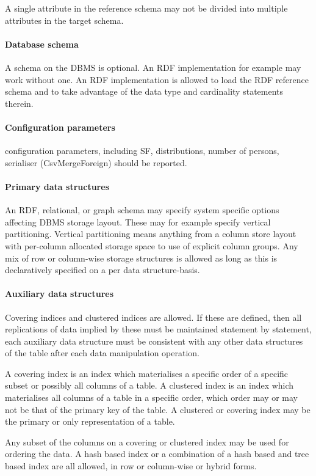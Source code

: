 A single attribute in the reference schema may not be divided into multiple attributes in the target schema.

\paragraph{Database schema}
A schema on the DBMS is optional. An RDF implementation for example may work without one. An RDF implementation is allowed to load the RDF reference schema and to take advantage of the data type and cardinality statements therein. 

\paragraph{Configuration parameters}
\datagen configuration parameters, including SF, distributions, number of persons, serialiser (\eg CsvMergeForeign) should be reported.

\paragraph{Primary data structures}
An RDF, relational, or graph schema may specify system specific options affecting DBMS storage layout. These may for example specify vertical partitioning. Vertical partitioning means anything from a column store layout with per-column allocated storage space to use of explicit column groups. Any mix of row or column-wise storage structures is allowed as long as this is declaratively specified on a per data structure-basis.

\paragraph{Auxiliary data structures}
Covering indices and clustered indices are allowed. If these are defined, then all replications of data implied by these must be maintained statement by statement, \ie each auxiliary data structure must be consistent with any other data structures of the table after each data manipulation operation.

A covering index is an index which materialises a specific order of a specific subset or possibly all columns of a table. 
A clustered index is an index which materialises all columns of a table in a specific order, which order may or may not be that of the primary key of the table. A clustered or covering index may be the primary or only representation of a table.

Any subset of the columns on a covering or clustered index may be used for ordering the data. A hash based index or a combination of a hash based and tree based index are all allowed, in row or column-wise or hybrid forms.

